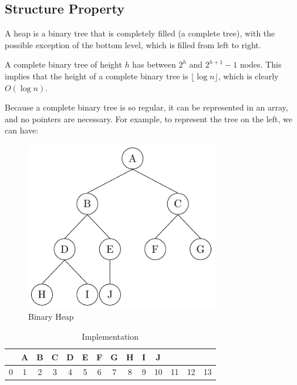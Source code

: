 \subsection{Structure Property}  
A heap is a binary tree that is completely filled (a complete tree), with the possible exception of the bottom level, which is filled from left to right.  

A complete binary tree of height \( h \) has between \( 2^h \) and \( 2^{h+1} - 1 \) nodes. This implies that the height of a complete binary tree is \( \lfloor \log n \rfloor \), which is clearly \( O(\log n) \).  

Because a complete binary tree is so regular, it can be represented in an array, and no pointers are necessary. For example, to represent the tree on the left, we can have:

\begin{minipage}{0.3\textwidth}
\begin{figure}[H]
  \centering
  \includegraphics[width=0.75\textwidth]{Figure/Heap1.pdf}
  \caption{Binary Heap}
\end{figure}
\end{minipage}\quad
\begin{minipage}{0.7\textwidth}
\begin{table}[H]
  \centering
  \begin{tabular}{c|c|c|c|c|c|c|c|c|c|c|c|c|c}
    \hline
     & A & B & C & D & E & F & G & H & I & J &  &  &  \\ \hline
    0 & 1 & 2 & 3 & 4 & 5 & 6 & 7 & 8 & 9 & 10 & 11 & 12 & 13 \\
  \end{tabular}
  \caption{Implementation}
\end{table}
\end{minipage}

